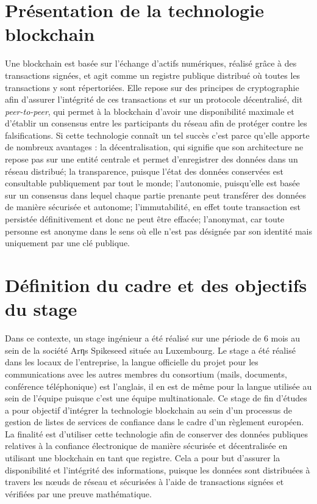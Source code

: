 \documentclass{tnreport}
\begin{document}
\section{Présentation de la technologie blockchain}

Une blockchain est basée sur l'échange d'actifs numériques, réalisé grâce à des transactions signées, et agit comme un registre publique distribué où toutes les transactions y sont répertoriées. Elle repose sur des principes de cryptographie afin d'assurer l'intégrité de ces transactions et sur un protocole décentralisé, dit {\em peer-to-peer}, qui permet à la blockchain d'avoir une disponibilité maximale et d'établir un consensus entre les participants du réseau afin de protéger contre les falsifications.
Si cette technologie connaît un tel succès c'est parce qu'elle apporte de nombreux avantages : 
la décentralisation, qui signifie que son architecture ne repose pas sur une entité centrale et permet d'enregistrer des données dans un réseau distribué; 
la transparence, puisque l'état des données conservées est consultable publiquement par tout le monde; 
l'autonomie, puisqu'elle est basée sur un consensus dans lequel chaque partie prenante peut transférer des données de manière sécurisée et autonome;
l'immutabilité, en effet toute transaction est persistée définitivement et donc ne peut être effacée;
l'anonymat, car toute personne est anonyme dans le sens où elle n'est pas désignée par son identité mais uniquement par une clé publique.

\section{Définition du cadre et des objectifs du stage}

Dans ce contexte, un stage ingénieur a été réalisé sur une période de 6 mois au sein de la société Arηs Spikeseed située au Luxembourg. 
Le stage a été réalisé dans les locaux de l'entreprise, la langue officielle du projet pour les communications avec les autres membres du consortium (mails, documents, conférence téléphonique) est l’anglais, il en est de même pour la langue utilisée au sein de l'équipe puisque c'est une équipe multinationale.
Ce stage de fin d'études a pour objectif d'intégrer la technologie blockchain au sein d'un processus de gestion de listes de services de confiance dans le cadre d'un règlement européen. 
La finalité est d'utiliser cette technologie afin de conserver des données publiques relatives à la confiance électronique de manière sécurisée et décentralisée en utilisant une blockchain en tant que registre.
Cela a pour but d'assurer la disponibilité et l'intégrité des informations, puisque les données sont distribuées à travers les nœuds de réseau et sécurisées à l'aide de transactions signées et vérifiées par une preuve mathématique. 
\end{document}
